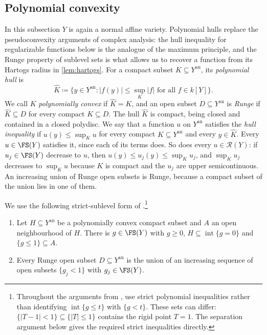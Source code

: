 \documentclass[11pt,a4paper]{article}
\newcommand{\an}{\mathrm{an}}          %
\begin{document}
\subsection{Polynomial convexity}\label{subsec:polynomial-convexity}

In this subsection $Y$ is again a normal affine variety. Polynomial hulls replace the pseudoconvexity arguments of complex analysis: the hull inequality for regularizable functions below is the analogue of the maximum principle, and the Runge property of sublevel sets is what allows us to recover a function from its Hartogs radius in \cref{lem:hartogs}. For a compact subset $K\subseteq Y^{\an}$, its \emph{polynomial hull} is
\[
\widehat K\coloneqq\{y\in Y^{\an}:|f(y)|\le\sup_K|f|\text{ for all }f\in k[Y]\}.
\]
We call $K$ \emph{polynomially convex} if $\widehat K=K$, and an open subset $D\subseteq Y^{\an}$ is \emph{Runge} if $\widehat K\subseteq D$ for every compact $K\subseteq D$. The hull $\widehat K$ is compact, being closed and contained in a closed polydisc. We say that a function $u$ on $Y^{\an}$ satisfies the \emph{hull inequality} if $u(y)\le\sup_Ku$ for every compact $K\subseteq Y^{\an}$ and every $y\in\widehat K$. Every $u\in\FS(Y)$ satisfies it, since each of its terms does. So does every $u\in\mathcal{R}(Y)$: if $u_j\in\FS(Y)$ decrease to $u$, then $u(y)\le u_j(y)\le\sup_Ku_j$, and $\sup_Ku_j$ decreases to $\sup_Ku$ because $K$ is compact and the $u_j$ are upper semicontinuous. An increasing union of Runge open subsets is Runge, because a compact subset of the union lies in one of them.

We use the following strict-sublevel form of \cite[Proposition~5.4]{Wu26}.\footnote{Throughout the arguments from \cite[\S5]{Wu26}, use strict polynomial inequalities rather than identifying $\operatorname{int}\{g\le t\}$ with $\{g<t\}$. These sets can differ: $\{|T-1|<1\}\subseteq\{|T|\le1\}$ contains the rigid point $T=1$. The separation argument below gives the required strict inequalities directly.}

\begin{lemma}\label{lem:polyhedral-neighborhoods}
\begin{enumerate}
\item Let $H\subseteq Y^{\an}$ be a polynomially convex compact subset and $A$ an open neighbourhood of $H$. There is $g\in\FS(Y)$ with $g\ge0$, $H\subseteq\operatorname{int}\{g=0\}$ and $\{g\le1\}\subseteq A$.
\item Every Runge open subset $D\subseteq Y^{\an}$ is the union of an increasing sequence of open subsets $\{g_j<1\}$ with $g_j\in\FS(Y)$.
\end{enumerate}
\end{lemma}
\end{document}
